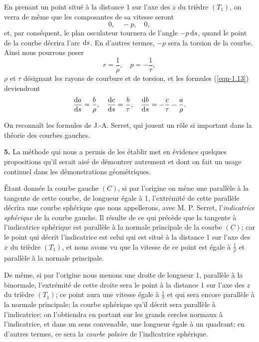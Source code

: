 En prenant un point situé à la distance 1 sur l'axe des $z$ du trièdre $(T_1)$, on verra de même que les composantes de 
sa vitesse seront
\[
	0, \quad -p, \quad 0,
\]
et, par conséquent, le plan osculateur tournera de l'angle $-p \operatorname{d}\!{s}$, quand le point de la courbe décrira l'arc 
$\operatorname{d}\!{s}$. En d'autres termes, $-p$ sera la torsion de la courbe. Ainsi nous pourrons poser
\begin{equation}
	r = \frac{1}{\rho},\quad p = -\frac{1}{\tau},
	\label{eqn-1.14}
\end{equation}
$\rho$ et $\tau$ désignant les rayons de courbure et de torsion, et les formules (\ref{eqn-1.13}) deviendront
\begin{equation}
	\frac{\operatorname{d}\!{a}}{\operatorname{d}\!{s}} = \frac{b}{\rho}, 
	 \quad \frac{\operatorname{d}\!{c}}{\operatorname{d}\!{s}} = \frac{b}{\tau},
	 \quad \frac{\operatorname{d}\!{b}}{\operatorname{d}\!{s}} = - \frac{c}{\tau} - \frac{a}{\rho}.
	\label{eqn-1.15}
\end{equation}

On reconnaît les formules de J.-A. Serret, qui jouent un rôle si important dans la théorie des courbes gauches.

\textbf{5.} La méthode qui nous a permis de les établir met en évidence quelques propositions qu'il serait aisé de 
démontrer autrement et dont on fait un usage continuel dans les démonstrations géométriques.

Étant donnée la courbe gauche $(C)$, si par l'origine on mène une parallèle à la tangente de cette courbe, de longueur 
égale à 1, l'extrémité de cette parallèle décrira une courbe sphérique que nous appellerons, avec M. P. Serret, 
l'\textit{indicatrice sphérique} de la courbe gauche. Il résulte de ce qui précède que la tangente à l'indicatrice 
sphérique est parallèle à la normale principale de la courbe $(C)$; car le point qui décrit l'indicatrice est celui qui 
est situé à la distance 1 sur l'axe des $x$ du trièdre $(T_1)$, et nous avons vu que la vitesse de ce point est égale à 
$\frac1\rho$ et parallèle à la normale principale. 

De même, si par l'origine nous menons une droite de longueur 1, parallèle à la binormale, l'extrémité de cette droite 
sera le point à la distance 1 sur l'axe des $z$ du trièdre $(T_1)$; ce point aura une vitesse égale à $\frac1\tau$ et 
qui sera encore parallèle à la normale principale; la courbe sphérique qu'il décrit sera parallèle à l'indicatrice: on 
l'obtiendra en portant sur les grands cercles normaux à l'indicatrice, et dans un sens convenable, une longueur égale à 
un quadrant; en d'autres termes, ce sera la \textit{courbe polaire} de l'indicatrice sphérique.

